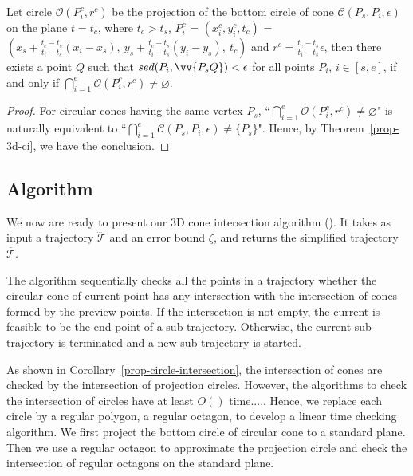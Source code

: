 \begin{cor}
\label{prop-circle-intersection}
 Let circle $\mathcal{O}(P^c_i, r^c)$ be the projection of the bottom circle of cone $\mathcal{C}(P_s, P_i, \epsilon)$ on the plane $t=t_c$, where $t_c>t_s$, $P^c_i$ =  $(x^c_i, y^c_i, t_c)$ = $(x_s +  \frac{t_c-t_s}{t_i - t_s}(x_i - x_s),~ y_s +  \frac{t_c - t_s}{t_i - t_s}(y_i - y_s),~t_c)$ and $r^c = \frac{t_c-t_s}{t_i-t_s}{\epsilon}$, then there exists a point $Q$ such that $sed(P_i, \vv{P_sQ})<\epsilon$ for all points $P_i$, $i \in [s,e]$, if and only if $\bigcap_{i=1}^{e}{\mathcal{O}(P^c_i, r^c)} \ne \varnothing$.
\end{cor}

\begin{proof}
For circular cones having the same vertex $P_s$, ``$\bigcap_{i=1}^{e}{\mathcal{O}(P^c_i, r^c)} \ne \varnothing$" is naturally equivalent to ``$\bigcap_{i=1}^{e}{\mathcal{C}(P_s, P_i, \epsilon)} \ne \{P_s\}$". Hence, by Theorem~\ref{prop-3d-ci}, we have the conclusion.
\end{proof}


\subsection{\textcolor[rgb]{0.00,0.07,1.00}{Algorithm}}
We now are ready to present our 3D cone intersection algorithm (\coneid). 
It takes as input a trajectory $\dddot{\mathcal{T}}$ and an error bound $\zeta$, and returns the simplified trajectory $\overline{\mathcal{T}}$.

The algorithm sequentially checks all the points in a trajectory whether the circular cone of current point has any intersection with the intersection of cones formed by the preview points. If the intersection is not empty, the current is feasible to be the end point of a sub-trajectory. Otherwise, the current sub-trajectory is terminated and a new sub-trajectory is started.

As shown in Corollary~\ref{prop-circle-intersection}, the intersection of cones are checked by the intersection of projection circles.
\textcolor[rgb]{0.00,0.07,1.00}{However, the algorithms to check the intersection of circles have at least $O()$ time.....
Hence, we replace each circle by a regular polygon, \eg a regular octagon, to develop a linear time checking algorithm.}
We first project the bottom circle of circular cone to a \textcolor[rgb]{0.00,0.07,1.00}{standard plane}.
Then we use a regular octagon to approximate the projection circle and check the intersection of regular octagons on the standard plane.

